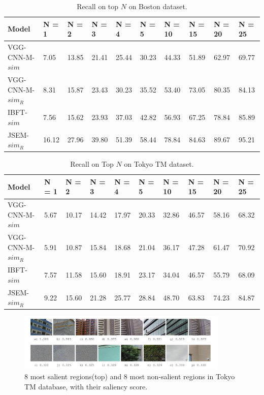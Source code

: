 \begin{table}[!t]
\begin{tabular}{l|l|l|l|l|l|l|l|l|l}
\textbf{Model} & \textbf{N = 1} & \textbf{N = 2}& \textbf{N = 3}& \textbf{N = 4}& \textbf{N = 5}& \textbf{N = 10}& \textbf{N = 15} & \textbf{N = 20} & \textbf{N = 25} \\
\hline
VGG-CNN-M-$sim$ &7.05 & 13.85 & 21.41 & 25.44 & 30.23 & 44.33 & 51.89 & 62.97 & 69.77 \\
VGG-CNN-M-$sim_R$ & 8.31 & 15.87 & 23.43 & 30.23 & 35.52 & 53.40 & 73.05 & 80.35 & 84.13 \\
IBFT-$sim$ & 7.56 & 15.62 & 23.93 & 37.03 & 42.82 & 56.93 & 67.25 & 78.84 & 85.89 \\
JSEM-$sim_R$ & 16.12 & 27.96 & 39.80 & 51.39 & 58.44 & 78.84 & 84.63 & 89.67 & 95.21
\end{tabular}
\caption{Recall on top $N$ on Boston dataset.}
\label{table:boston_recall}
\end{table} 


\begin{table}[!t]
\begin{tabular}{l|l|l|l|l|l|l|l|l|l}
\textbf{Model} & \textbf{N = 1} & \textbf{N = 2}& \textbf{N = 3}& \textbf{N = 4}& \textbf{N = 5}& \textbf{N = 10}& \textbf{N = 15} & \textbf{N = 20} & \textbf{N = 25} \\
\hline
VGG-CNN-M-$sim$ & 5.67&10.17& 14.42& 17.97& 20.33& 32.86& 46.57& 58.16& 68.32 \\
VGG-CNN-M-$sim_R$ & 5.91& 10.87& 15.84& 18.68& 21.04& 36.17& 47.28& 61.47& 70.92 \\
IBFT-$sim$ & 7.57& 11.58& 15.60& 18.91& 23.17& 34.04& 46.57& 55.79& 68.09 \\
JSEM-$sim_R$ & 9.22 & 15.60 & 21.28 & 25.77& 28.84&48.70&63.83&74.23&84.87 
\end{tabular}
\caption{Recall on Top $N$ on Tokyo TM dataset.}
\label{table:netvlad-result}
\end{table} 

\begin{figure}[!t]
\includegraphics[width=0.9\textwidth]{img/salient}
\caption{8 most salient regions(top) and 8 most non-salient regions in Tokyo TM database, with their saliency score.}
\label{fig:saliency}
\end{figure}

